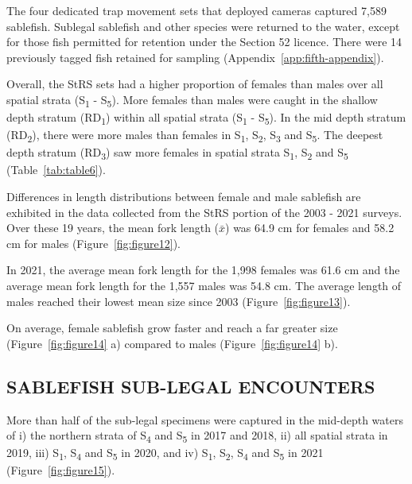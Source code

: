 \documentclass[12pt]{article}\usepackage[]{graphicx}\usepackage[]{color}
\begin{document}
The four dedicated trap movement sets that deployed cameras captured 7,589 sablefish. Sublegal sablefish and other species were returned to the water, except for those fish permitted for retention under the Section 52 licence. There were 14 previously tagged fish retained for sampling (Appendix~\ref{app:fifth-appendix}).

Overall, the StRS sets had a higher proportion of females than males over all spatial strata (S\textsubscript{1} - S\textsubscript{5}). More females than males were caught in the shallow depth stratum (RD\textsubscript{1}) within all spatial strata (S\textsubscript{1} - S\textsubscript{5}). In the mid depth stratum (RD\textsubscript{2}), there were more males than females in S\textsubscript{1}, S\textsubscript{2}, S\textsubscript{3} and S\textsubscript{5}. The deepest depth stratum (RD\textsubscript{3}) saw more females in spatial strata S\textsubscript{1}, S\textsubscript{2} and S\textsubscript{5} (Table~\ref{tab:table6}).

Differences in length distributions between female and male sablefish are exhibited in the data collected from the StRS portion of the 2003 - 2021 surveys. Over these 19 years, the mean fork length (\(\bar{x}\)) was 64.9 cm for females and 58.2 cm for males (Figure~\ref{fig:figure12}).

In 2021, the average mean fork length for the 1,998 females was 61.6 cm and the average mean fork length for the 1,557 males was 54.8 cm. The average length of males reached their lowest mean size since 2003 (Figure~\ref{fig:figure13}).

On average, female sablefish grow faster and reach a far greater size (Figure~\ref{fig:figure14} a) compared to males (Figure~\ref{fig:figure14} b).

\hypertarget{sablefish-sub-legal-encounters}{%
\subsection{SABLEFISH SUB-LEGAL ENCOUNTERS}\label{sablefish-sub-legal-encounters}}

More than half of the sub-legal specimens were captured in the mid-depth waters of i) the northern strata of S\textsubscript{4} and S\textsubscript{5} in 2017 and 2018, ii) all spatial strata in 2019, iii) S\textsubscript{1}, S\textsubscript{4} and S\textsubscript{5} in 2020, and iv) S\textsubscript{1}, S\textsubscript{2}, S\textsubscript{4} and S\textsubscript{5} in 2021 (Figure~\ref{fig:figure15}).
\end{document}
